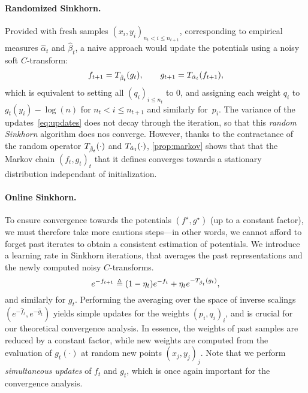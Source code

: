 \paragraph{Randomized Sinkhorn.}

Provided with fresh samples $(x_i, y_i)_{n_t < i \leq n_{t+1}}$, 
corresponding to empirical measures $\hat \alpha_t$ and $\hat \beta_t$, a naive approach would 
 update the potentials using a noisy soft $C$-transform:
\begin{equation}\label{eq:updates}
     f_{t+1} = \Ctrans{g_t}{\hat \beta_t},
    \qquad g_{t+1} = \Ctrans{f_{t+1}}{\hat \alpha_t},
\end{equation}
which is equivalent to setting all $(q_i)_{i \leq n_t}$ to $0$, and assigning each weight
 $q_i$ to $g_t(y_i) - \log(n)$ for $n_t < i \leq  n_{t+1}$ and similarly for~$p_i$.
%
The variance of the updates~\eqref{eq:updates} does not decay through the iteration, so that this
\textit{random Sinkhorn} algorithm does nos converge. However, thanks to the contractance of the random operator $\Ctrans{\cdot}{\hat \beta_t}$ and $\Ctrans{\cdot}{\hat \alpha_t}$, \autoref{prop:markov} shows that that the Markov chain ${(f_t,
g_t)}_t$ that it defines converges towards a stationary distribution independant
of initialization.

\paragraph{Online Sinkhorn.}

To ensure convergence towards the potentials $(f^\star, g^\star)$ (up to a
constant factor), we must therefore take more cautions steps---in other words,
we cannot afford to forget past iterates to obtain a consistent estimation of
potentials. We introduce a learning rate in Sinkhorn iterations, that averages
the past representations and the newly computed noisy $C$-transforms.
\begin{equation}\label{eq:updates}
    e^{-f_{t+1}}
    \eqdef (1 - \eta_t) e^{-f_t} 
    + \eta_t 
    e^{-\Ctrans{g_t}{\hat \beta_t}},
\end{equation}
and similarly for $g_t$. Performing the averaging over the space of inverse scalings
$(e^{-\hat f_{t}},e^{-\hat g_{t}})$ yields simple updates for the weights
${(p_i,q_i)}_i$, and is crucial for our theoretical convergence analysis. In essence, the
weights of past samples are reduced by a constant factor, while new weights are
computed from the evaluation of $g_t(\cdot)$ at random new points ${(x_j, y_j)}_j$. Note that we
perform \textit{simultaneous updates} of $f_t$ and $g_t$, which is once again important for the convergence analysis.

